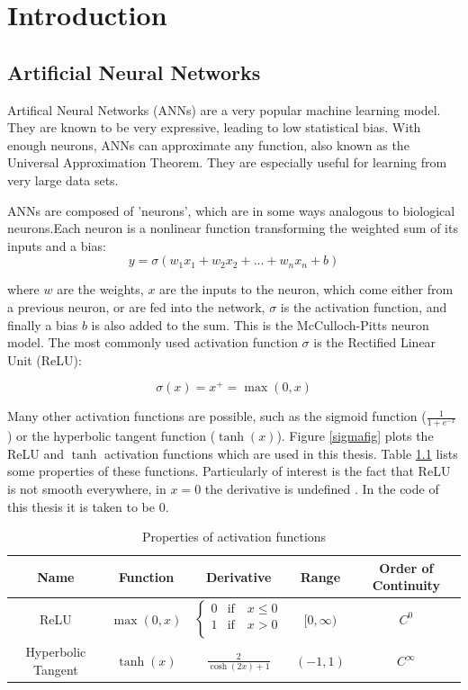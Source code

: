 \chapter{Introduction}
\section{Artificial Neural Networks}

Artifical Neural Networks (ANNs) are a very popular machine learning model. They are known to be very expressive, leading to low statistical bias. With enough neurons, ANNs can approximate any function, also known as the Universal Approximation Theorem\cite{cybenko1989}.  They are especially useful for learning from very large data sets.

ANNs are composed of 'neurons', which are in some ways analogous to biological neurons.Each neuron is a nonlinear function transforming the weighted sum of its inputs and a bias:
\begin{equation}
      y = \sigma(w_1x_1+w_2x_2+...+w_nx_n + b)
\end{equation}

where $w$ are the weights, $x$ are the inputs to the neuron, which come either from a previous neuron, or are fed into the network, $\sigma$ is the activation function, and finally a bias $b$ is also added to the sum. This is the McCulloch-Pitts neuron model\cite{McCulloch1990}. The most commonly used activation function $\sigma$ is the Rectified Linear Unit (ReLU):

\begin{equation}
      \sigma(x) = x^+ = \max(0,x)
\end{equation}

Many other activation functions are possible, such as the sigmoid function ($\frac{1}{1+e^{-x}}$) or the hyperbolic tangent function ($\tanh(x)$). Figure \ref{sigmafig} plots the ReLU and $\tanh$ activation functions which are used in this thesis. Table \ref{sigprop} lists some properties of these functions. Particularly of interest is the fact that ReLU is not smooth everywhere, in $x=0$ the derivative is undefined \cite{wikiact}. In the code of this thesis it is taken to be $0$.


\begin{table}
\centering
\begin{tabular}{ c | c c c c}
Name & Function & Derivative & Range & Order of Continuity \\ \hline
ReLU & $\max(0,x)$ & $ 
     \begin{cases}
       0 &\text{if} \quad x \leq 0\\
       1 &\text{if} \quad x > 0 \\
     \end{cases}$ & $[0,\infty)$ & $C^0$ \\
Hyperbolic Tangent & $\tanh(x)$ & $\frac{2}{\cosh(2x)+1}$ & $(-1,1)$ & $C^{\infty}$
\end{tabular}
\caption{Properties of activation functions}
\label{sigprop}
\end{table}

